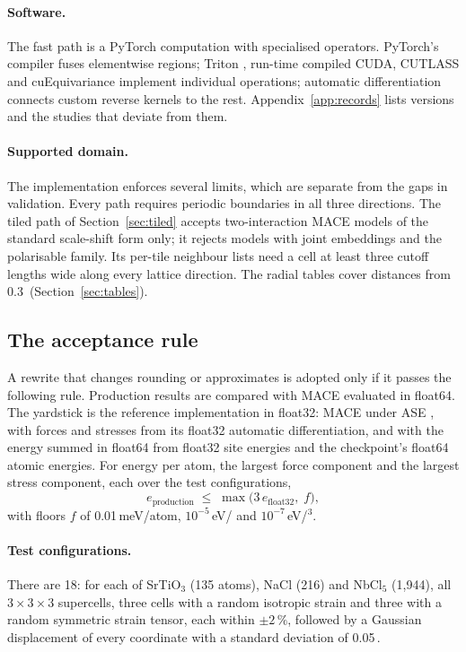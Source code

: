 \documentclass[11pt]{article}
\newcommand{\angstrom}{\text{\AA}}
\begin{document}
\paragraph{Software.}
The fast path is a PyTorch computation with specialised operators. PyTorch's compiler
\cite{ansel2024pytorch2} fuses elementwise regions; Triton \cite{tillet2019triton}, run-time compiled CUDA,
CUTLASS \cite{cutlass} and cuEquivariance \cite{cuequivariance} implement individual operations; automatic
differentiation connects custom reverse kernels to the rest. Appendix~\ref{app:records} lists versions and the
studies that deviate from them.

\paragraph{Supported domain.}
The implementation enforces several limits, which are separate from the gaps in validation. Every path requires
periodic boundaries in all three directions. The tiled path of Section~\ref{sec:tiled} accepts two-interaction
MACE models of the standard scale-shift form only; it rejects models with joint embeddings and the polarisable
family. Its per-tile neighbour lists need a cell at least three cutoff lengths wide along every lattice
direction. The radial tables cover distances from 0.3\,\angstrom{} (Section~\ref{sec:tables}).

\subsection{The acceptance rule}
\label{sec:contract}

A rewrite that changes rounding or approximates is adopted only if it passes the following rule. Production
results are compared with MACE evaluated in float64. The yardstick is the reference implementation in float32:
MACE under ASE \cite{larsen2017ase}, with forces and stresses from its float32 automatic differentiation, and
with the energy summed in float64 from float32 site energies and the checkpoint's float64 atomic energies. For
energy per atom, the largest force component and the largest stress component, each over the test
configurations,
\begin{equation}
e_{\text{production}} \;\le\; \max\bigl(3\, e_{\text{float32}},\; f\bigr),
\label{eq:rule}
\end{equation}
with floors $f$ of 0.01\,meV/atom, $10^{-5}$\,eV/\angstrom{} and $10^{-7}$\,eV/\angstrom$^3$.

\paragraph{Test configurations.}
There are 18: for each of SrTiO$_3$ (135 atoms), NaCl (216) and NbCl$_5$ (1{,}944), all $3\times3\times3$
supercells, three cells with a random isotropic strain and three with a random symmetric strain tensor, each
within $\pm2\,\%$, followed by a Gaussian displacement of every coordinate with a standard deviation of
0.05\,\angstrom.
\end{document}
